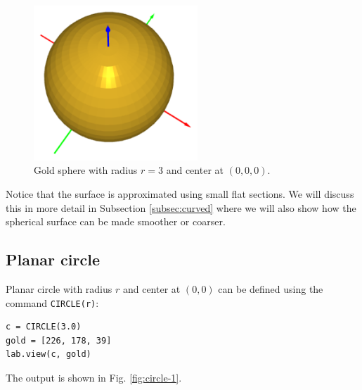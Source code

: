 \begin{figure}[!ht]
\begin{center}
\includegraphics[width=0.55\textwidth]{img/sphere-1.png}
\end{center}
\vspace{-4mm}
\caption{Gold sphere with radius $r = 3$ and center at $(0, 0, 0)$.}
\label{fig:sphere-1}
\end{figure}
\noindent
Notice that the surface is approximated using small flat sections. 
We will discuss this in more detail in Subsection \ref{subsec:curved}
where we will also show how the spherical surface can be made 
smoother or coarser.


\subsection{Planar circle}

Planar circle with radius $r$ and center at $(0, 0)$ can be defined 
using the command {\tt CIRCLE(r)}:\\

\begin{bbox}
\begin{verbatim}
c = CIRCLE(3.0)
gold = [226, 178, 39]
lab.view(c, gold)
\end{verbatim}
\end{bbox}
\vspace{6mm}

\noindent
\noindent
The output is shown in Fig. \ref{fig:circle-1}.
\newpage


